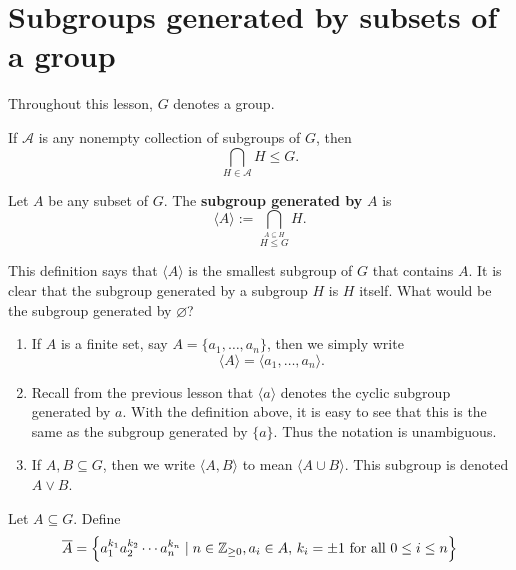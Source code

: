 \documentclass[11pt,a4paper]{article}
\begin{document}
\def\contador{Lesson 8}



\section{Subgroups generated by subsets of a group}

Throughout this lesson, \(G\) denotes a group.

\begin{prop}
    If \(\mathcal{A}\) is any nonempty collection of subgroups of \(G\), then 
    \[\bigcap_{H\in \mathcal{A}} H \leq G.\]
\end{prop}



\begin{defi}
Let \(A\) be any subset of \(G\).
The \textbf{subgroup generated by} \(A\) is 
\[\langle A\rangle := \bigcap_{\stackrel{A\subseteq H }{H\leq G }  } H .\]
\end{defi}

This definition says that \(\langle A\rangle \) is the smallest subgroup of \(G\) that contains \(A\). 
It is clear that   the subgroup generated by a subgroup \(H\) is \(H\) itself. 
What would be the subgroup generated by \(\varnothing\)?


\begin{rem}
\begin{enumerate}[label=(\roman*)]
    \item      If \(A \) is a finite set, say \(A = \{a_1, \ldots, a_n \}\),
    then we simply write \[\langle A\rangle = \langle a_1, \ldots, a_n \rangle .\]

    \item Recall from the previous lesson that \(\langle a\rangle\) denotes the cyclic subgroup generated by \(a\).
    With the definition above, it is easy to see that this is the same as the subgroup generated by \(\{a\}\).
    Thus the notation is unambiguous.

    \item If \(A,B\subseteq G\), then we write  \(\langle A, B \rangle\) to mean  \(\langle A\cup B\rangle \).
    This subgroup is denoted \(A \vee B\). 
\end{enumerate}
\end{rem}
 
\begin{defi}
    Let \(A\subseteq     G\).
    Define 
    \[\overline{A} = \left\{ a_1^{k_1} a_2^{k_2} \cdots a_{n}^{k_n} \mid n\in \mathbb{Z}_{\geq 0}, a_i \in A ,\, k_i = \pm 1 \text{ for all } 0 \leq i\leq n \right\}\]
\end{defi}
\end{document}
